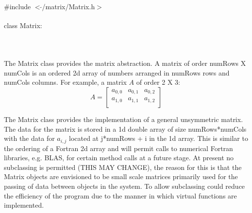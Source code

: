 
   \\
\indent \#include $<\tilde{}$/matrix/Matrix.h$>$  \\

  \\
\indent class Matrix:  \\

 \\
 \\

  \\
\indent The Matrix class provides the matrix abstraction. A matrix of
order numRows X numCols is an ordered 2d array of numbers arranged in
numRows rows and numCols columns. For example, a matrix $A$ of order 2
X 3:
$$ A =
\left[
\begin{array}{ccc}
a_{0,0} & a_{0,1}  & a_{0,2}  \\
a_{1,0} & a_{1,1} & a_{1,2}  \\
\end{array}
\right] 
$$

The Matrix class provides the implementation of a general unsymmetric
matrix. The data for the matrix is stored in a 1d double array of size
numRows*numCols with the data for $a_{i,j}$ located at j*numRows + i
in the 1d array. This is similar to the ordering of a Fortran 2d array
and will permit calls to numerical Fortran libraries, e.g. BLAS, for
certain method calls at a future stage. At present no subclassing is
permitted (THIS MAY CHANGE), the reason for this is that the Matrix
objects are envisioned to be small scale matrices primarily used for
the passing of data between objects in the system. To allow subclassing
could reduce the efficiency of the program due to the manner in which 
virtual functions are implemented.\\ 

